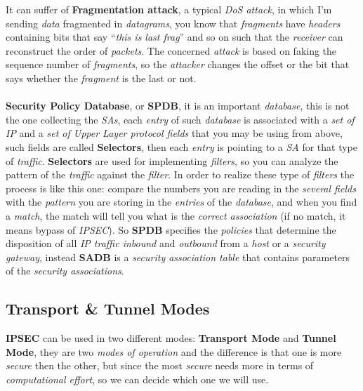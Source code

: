 \documentclass{article}
\begin{document}
It can suffer of \textbf{Fragmentation attack}, a typical\emph{ DoS attack}, in which I'm sending \emph{data} fragmented in \emph{datagrams}, you know that \emph{fragments} have \emph{headers} containing bits that say “\emph{this is last frag}” and so on such that the \emph{receiver} can reconstruct the order of \emph{packets}. The concerned \emph{attack} is based on faking the sequence number of \emph{fragments}, so the \emph{attacker} changes the offset or the bit that says whether the \emph{fragment} is the last or not. \\\\
\textbf{Security Policy Database}, or \textbf{SPDB}, it is an important \emph{database}, this is not the one collecting the \emph{SAs}, each \emph{entry} of such \emph{database} is associated with a \emph{set of IP} and a \emph{set of Upper Layer protocol fields} that you may be using from above, such fields are called \textbf{Selectors}, then each \emph{entry} is pointing to a \emph{SA} for that type of \emph{traffic}. \textbf{Selectors} are used for implementing \emph{filters}, so you can analyze the pattern of the \emph{traffic} against the \emph{filter}. In order to realize these type of \emph{filters} the process is like this one: compare the numbers you are reading in the \emph{several fields} with the \emph{pattern} you are storing in the \emph{entries} of the \emph{database}, and when you find a \emph{match}, the match will tell you what is the \emph{correct association} (if no match, it means bypass of \emph{IPSEC}). So \textbf{SPDB} specifies the \emph{policies} that determine the disposition of all \emph{IP traffic inbound} and \emph{outbound} from a \emph{host} or a \emph{security gateway}, instead \textbf{SADB} is a \emph{security association table} that contains parameters of the \emph{security associations}.
\subsection{Transport \& Tunnel Modes}
\textbf{IPSEC} can be used in two different modes: \textbf{Transport Mode} and \textbf{Tunnel Mode}, they are two \emph{modes of operation} and the difference is that one is more \emph{secure} then the other, but since the most \emph{secure} needs more in terms of \emph{computational effort}, so we can decide which one we will use. 
\end{document}
